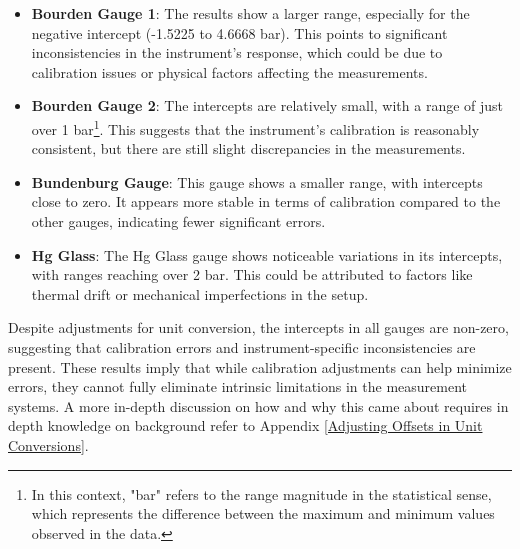 \documentclass{article}
\begin{document}
\begin{itemize}
	\item \textbf{Bourden Gauge 1}: The results show a larger range, especially for the negative intercept (-1.5225 to 4.6668 bar). This points to significant inconsistencies in the instrument's response, which could be due to calibration issues or physical factors affecting the measurements.
	\item \textbf{Bourden Gauge 2}: The intercepts are relatively small, with a range of just over 1 bar\footnote{In this context, "bar" refers to the range magnitude in the statistical sense, which represents the difference between the maximum and minimum values observed in the data.}. This suggests that the instrument's calibration is reasonably consistent, but there are still slight discrepancies in the measurements.
	\item \textbf{Bundenburg Gauge}: This gauge shows a smaller range, with intercepts close to zero. It appears more stable in terms of calibration compared to the other gauges, indicating fewer significant errors.	
	\item \textbf{Hg Glass}: The Hg Glass gauge shows noticeable variations in its intercepts, with ranges reaching over 2 bar. This could be attributed to factors like thermal drift or mechanical imperfections in the setup.
\end{itemize}
Despite adjustments for unit conversion, the intercepts in all gauges are non-zero, suggesting that calibration errors and instrument-specific inconsistencies are present. These results imply that while calibration adjustments can help minimize errors, they cannot fully eliminate intrinsic limitations in the measurement systems. A more in-depth discussion on how and why this came about requires in depth knowledge on background refer to Appendix \ref{Adjusting Offsets in Unit Conversions}.

\newpage
\end{document}
